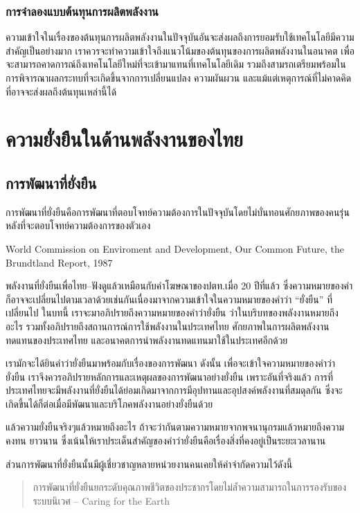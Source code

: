 \documentclass[a4paper,nobib,openany,10pt]{tufte-book}
\begin{document}
\section{การจำลองแบบต้นทุนการผลิตพลังงาน}
\label{sec:orge5939ca}
ความเข้าใจในเรื่องของต้นทุนการผลิตพลังงานในปัจจุบันอันจะส่งผลถึงการยอมรับใช้เทคโนโลยีมีความสำคัญเป็นอย่างมาก เราควรจะทำความเข้าใจถึงแนวโน้มของต้นทุนของการผลิตพลังงานในอนาคต เพื่อจะสามารถคาดการณ์ถึงเทคโนโลยีใหม่ที่จะเข้ามาแทนที่เทคโนโลยีเดิม รวมถึงสามรถเตรียมพร้อมในการพิจารณาผลกระทบที่จะเกิดขึ้นจากการเปลี่ยนแปลง ความผันผวน และแม้แต่เหตุการณ์ที่ไม่คาดคิดที่อาจจะส่งผลถึงต้นทุนเหล่านี้ได้


\part{ความยั่งยืนในด้านพลังงานของไทย}
\label{sec:orgf360aec}
\chapter{การพัฒนาที่ยั่งยืน}
\label{sec:orgce3a187}

\epigraph{การพัฒนาที่ยั่งยืนคือการพัฒนาที่ตอบโจทย์ความต้องการในปัจจุบันโดยไม่บั่นทอนศักยภาพของคนรุ่นหลังที่จะตอบโจทย์ความต้องการของตัวเอง}{World Commission on Enviroment and Development, Our Common Future, the Brundtland Report, 1987}

พลังงานที่ยั่งยืนเพื่อไทย--ฟังดูแล้วเหมือนกับคำโฆษณาของปตท.เมื่อ 20
ปีที่แล้ว
ซึ่งความหมายของคำก็อาจจะเปลี่ยนไปตามเวลาด้วยเช่นกันเนื่องมาจากความเข้าใจในความหมายของคำว่า
``ยั่งยืน'' ที่เปลี่ยนไป ในบทนี้ เราจะมาอภิปรายถึงความหมายของคำว่ายั่งยืน
ว่าในบริบทของพลังงานหมายถึงอะไร
รวมทั้งอภิปรายถึงสถานการณ์การใช้พลังงานในประเทศไทย
ศักยภาพในการผลิตพลังงานทดแทนของประเทศไทย
และอนาคตการนำพลังงานทดแทนมาใช้ในประเทศอีกด้วย

เรามักจะได้ยินคำว่ายั่งยืนมาพร้อมกับเรื่องของการพัฒนา ดังนั้น
เพื่อจะเข้าใจความหมายของคำว่ายั่งยืน
เราจึงควรอภิปรายหลักการและเหตุผลของการพัฒนาอย่างยั่งยืน
เพราะอันที่จริงแล้ว
การที่ประเทศไทยจะมีพลังงานที่ยั่งยืนได้ย่อมเกิดมาจากการมีอุปทานและอุปสงค์พลังงานที่สมดุลกัน
ซึ่งจะเกิดขึ้นได้ก็ต่อเมื่อมีพัฒนาและบริโภคพลังงานอย่างยั่งยืนด้วย

แล้วความยั่งยืนจริงๆแล้วหมายถึงอะไร
ถ้าจะว่ากันตามความหมายจากพจนานุกรมแล้วหมายถึงความคงทน ยาวนาน
ซึ่งเน้นให้เราประเด็นสำคัญของคำว่ายั่งยืนคือเรื่องสิ่งที่คงอยู่เป็นระยะเวลานาน

ส่วนการพัฒนาที่ยั่งยืนนั้นมีผู้เชี่ยวชาญหลายหน่วยงานคนเคยให้คำจำกัดความไว้ดังนี้

\begin{quote}
การพัฒนาที่ยั่งยืนยกระดับคุณภาพชีวิตของประชากรโดยไม่ล้ำความสามารถในการรองรับของระบบนิเวศ
-- Caring for the Earth
\end{quote}
\end{document}
